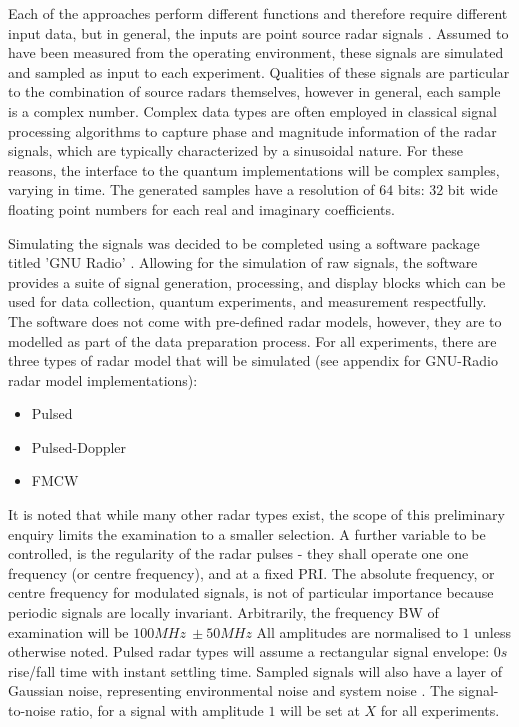 Each of the approaches perform different functions and therefore require different input data, but in general, the inputs are point source radar signals \cite{chakravorty_what_2018}.
Assumed to have been measured from the operating environment, these signals are simulated and sampled as input to each experiment.
Qualities of these signals are particular to the combination of source radars themselves, however in general, each sample is a complex number.
Complex data types are often employed in classical signal processing algorithms to capture phase and magnitude information of the radar signals, which are typically characterized by a sinusoidal nature.
For these reasons, the interface to the quantum implementations will be complex samples, varying in time.
The generated samples have a resolution of \(64\) bits: \(32\) bit wide floating point numbers for each real and imaginary coefficients.

Simulating the signals was decided to be completed using a software package titled 'GNU Radio' \cite{gnu_radio_contributors_gnu_2022}.
Allowing for the simulation of raw signals, the software provides a suite of signal generation, processing, and display blocks which can be used for data collection, quantum experiments, and measurement respectfully.
The software does not come with pre-defined radar models, however, they are to modelled as part of the data preparation process.
For all experiments, there are three types of radar model that will be simulated (see appendix for GNU-Radio radar model implementations):
\begin{itemize}
    \item Pulsed
    \item Pulsed-Doppler
    \item \ac{FMCW}
\end{itemize}
It is noted that while many other radar types exist, the scope of this preliminary enquiry limits the examination to a smaller selection.
A further variable to be controlled, is the regularity of the radar pulses - they shall operate one one frequency (or centre frequency), and at a fixed \ac{PRI}.
The absolute frequency, or centre frequency for modulated signals, is not of particular importance because periodic signals are locally invariant.
Arbitrarily, the frequency \ac{BW} of examination will be \(100MHz\ \pm 50MHz\)
All amplitudes are normalised to \(1\) unless otherwise noted.
Pulsed radar types will assume a rectangular signal envelope: \(0s\) rise/fall time with instant settling time.
Sampled signals will also have a layer of Gaussian noise, representing environmental noise and system noise .
The signal-to-noise ratio, for a signal with amplitude \(1\) will be set at \textbf{\(X\)} for all experiments.

